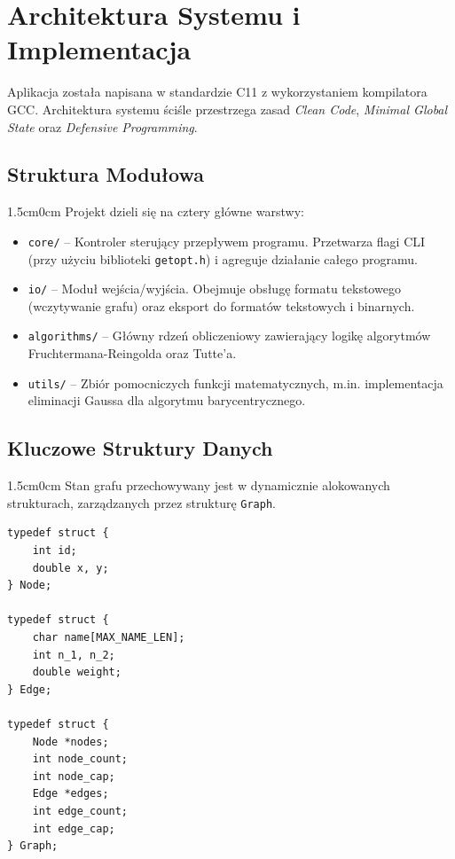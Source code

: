 \documentclass[12pt,a4paper]{article}
\begin{document}
\section{Architektura Systemu i Implementacja}

Aplikacja została napisana w standardzie C11 z wykorzystaniem kompilatora GCC. Architektura systemu ściśle przestrzega zasad \textit{Clean Code}, \textit{Minimal Global State} oraz \textit{Defensive Programming}.

\noindent
\begin{minipage}{\textwidth}
\subsection{Struktura Modułowa}
\begin{adjustwidth}{1.5cm}{0cm}
Projekt dzieli się na cztery główne warstwy:
\begin{itemize}
    \item \texttt{core/} – Kontroler sterujący przepływem programu. Przetwarza flagi CLI (przy użyciu biblioteki \texttt{getopt.h}) i agreguje działanie całego programu.
    \item \texttt{io/} – Moduł wejścia/wyjścia. Obejmuje obsługę formatu tekstowego (wczytywanie grafu) oraz eksport do formatów tekstowych i binarnych.
    \item \texttt{algorithms/} – Główny rdzeń obliczeniowy zawierający logikę algorytmów Fruchtermana-Reingolda oraz Tutte'a.
    \item \texttt{utils/} – Zbiór pomocniczych funkcji matematycznych, m.in. implementacja eliminacji Gaussa dla algorytmu barycentrycznego.
\end{itemize}
\end{adjustwidth}
\end{minipage}
\vspace{0.5cm}

\noindent
\begin{minipage}{\textwidth}
\subsection{Kluczowe Struktury Danych}
\begin{adjustwidth}{1.5cm}{0cm}
Stan grafu przechowywany jest w dynamicznie alokowanych strukturach, zarządzanych przez strukturę \texttt{Graph}.
\begin{lstlisting}[style=c-code, caption={Uproszczony model struktur danych}]
typedef struct {
    int id;
    double x, y;
} Node;

typedef struct {
    char name[MAX_NAME_LEN];
    int n_1, n_2;
    double weight;
} Edge;

typedef struct {
    Node *nodes;
    int node_count;
    int node_cap;
    Edge *edges;
    int edge_count;
    int edge_cap;
} Graph;
\end{lstlisting}
\end{adjustwidth}
\end{minipage}
\vspace{0.5cm}
\end{document}
